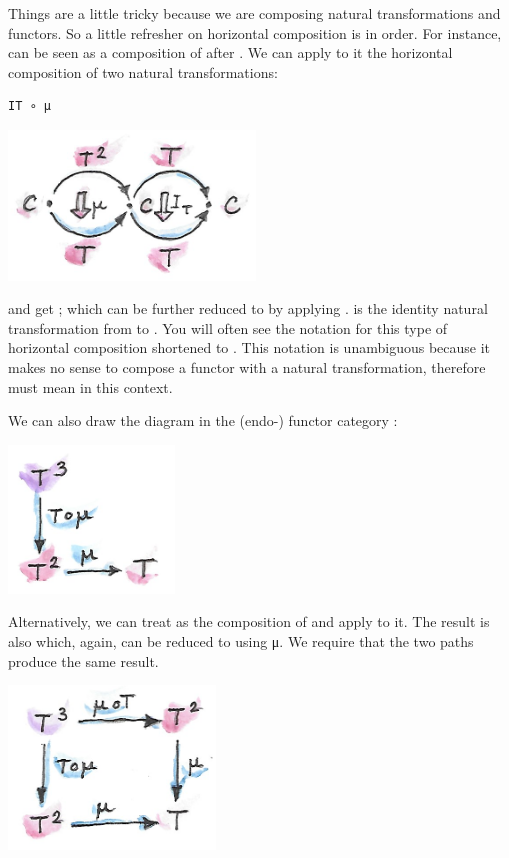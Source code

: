 Things are a little tricky because we are composing natural
transformations and functors. So a little refresher on horizontal
composition is in order. For instance,  can be seen as a
composition of  after . We can apply to it the
horizontal composition of two natural transformations:

\begin{verbatim}
IT ∘ μ
\end{verbatim}

\includegraphics[width=2.58333in]{images/assoc1.png}

and get ; which can be further reduced to  by
applying .  is the identity natural transformation
from  to . You will often see the notation for this
type of horizontal composition  shortened to
. This notation is unambiguous because it makes no sense to
compose a functor with a natural transformation, therefore 
must mean  in this context.

We can also draw the diagram in the (endo-) functor category
\code{{[}C,\ C{]}}:

\includegraphics[width=1.73958in]{images/assoc2.png}

Alternatively, we can treat  as the composition of
 and apply  to it. The result is also
 which, again, can be reduced to  using μ. We
require that the two paths produce the same result.

\includegraphics[width=2.16667in]{images/assoc.png}

